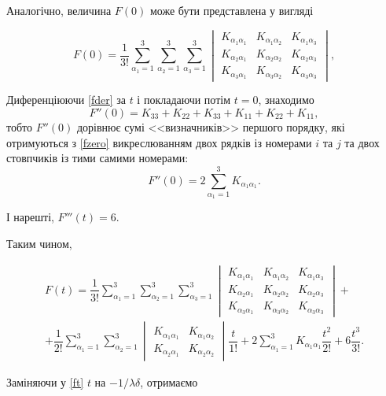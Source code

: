\documentclass[14pt,twoside]{extreport}
\theoremstyle{mystyle}
\numberwithin{equation}{chapter}
\begin{document}
Аналогічно, величина $F(0)$ може бути представлена у вигляді

\begin{equation}\label{fzer2}
F(0)=\dfrac{1}{3!}
\sum\limits_{\alpha_1=1}^{3}\sum\limits_{\alpha_2=1}^{3}\sum\limits_{\alpha_3=1}^{3}
\begin{vmatrix}
K_{\alpha_1\alpha_1} & K_{\alpha_1\alpha_2} & K_{\alpha_1\alpha_3}\\
K_{\alpha_2\alpha_1} & K_{\alpha_2\alpha_2} & K_{\alpha_2\alpha_3}\\
K_{\alpha_3\alpha_1} & K_{\alpha_3\alpha_2} & K_{\alpha_3\alpha_3}
\end{vmatrix},
\end{equation}

Диференціюючи \eqref{fder} за $t$ і покладаючи потім $t = 0$, знаходимо
\[
 F''(0) = K_{33} + K _{22} + K_{33} + K_{11} + K_{22} + K_{11},
\]
тобто $F''(0)$ дорівнює сумі <<визначників>> першого порядку, які отримуються з \eqref{fzero} викреслюванням двох рядків із номерами $i$ та $j$ та двох стовпчиків із тими самими номерами:
\begin{equation}\label{eqdder}
 F''(0)=2\sum\limits_{\alpha_1=1}^{3}K_{\alpha_1\alpha_1}.
\end{equation}

І нарешті, $F'''(t)=6$.

Таким чином,

\begin{multline}\label{ft}
F(t)=\dfrac{1}{3!}
\sum\limits_{\alpha_1=1}^{3}\sum\limits_{\alpha_2=1}^{3}\sum\limits_{\alpha_3=1}^{3}
\begin{vmatrix}
K_{\alpha_1\alpha_1} & K_{\alpha_1\alpha_2} & K_{\alpha_1\alpha_3}\\
K_{\alpha_2\alpha_1} & K_{\alpha_2\alpha_2} & K_{\alpha_2\alpha_3}\\
K_{\alpha_3\alpha_1} & K_{\alpha_3\alpha_2} & K_{\alpha_3\alpha_3}
\end{vmatrix}+\\
+\dfrac{1}{2!}
\sum\limits_{\alpha_1=1}^{3}\sum\limits_{\alpha_2=1}^{3}
\begin{vmatrix}
K_{\alpha_1\alpha_1} & K_{\alpha_1\alpha_2}\\
K_{\alpha_2\alpha_1} & K_{\alpha_2\alpha_2}
\end{vmatrix}\dfrac{t}{1!}+
2\sum\limits_{\alpha_1=1}^{3}K_{\alpha_1\alpha_1}\dfrac{t^2}{2!}+6\dfrac{t^3}{3!}.
\end{multline}

Заміняючи у \eqref{ft} $t$ на $-1/\lambda\delta$, отримаємо
\end{document}
